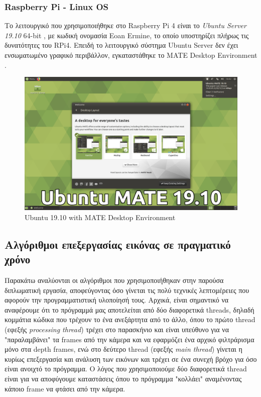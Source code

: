 \subsubsection{Raspberry Pi - Linux OS}
Το λειτουργικό που χρησιμοποιήθηκε στο Raspberry Pi 4 είναι το \emph{Ubuntu Server 19.10} 64-bit \cite{InstallU96:online}, με κωδική ονομασία Eoan Ermine, το οποίο υποστηρίζει πλήρως τις δυνατότητες του RPi4. Επειδή το λειτουργικό σύστημα Ubuntu Server δεν έχει ενσωματωμένο γραφικό περιβάλλον, εγκαταστάθηκε το MATE Desktop Environment \cite{MATEDesk37:online}.

\begin{figure}[H]
    \centering
    \includegraphics[width=\textwidth]{images/eoan-ermine-desktop.png}
    \caption{Ubuntu 19.10 with MATE Desktop Environment}
    \label{fig:mate}
\end{figure}

\subsection{Αλγόριθμοι επεξεργασίας εικόνας σε πραγματικό χρόνο}
Παρακάτω αναλύονται οι αλγόριθμοι που χρησιμοποιήθηκαν στην παρούσα διπλωματική εργασία, αποφεύγοντας όσο γίνεται τις πολύ τεχνικές λεπτομέρειες που αφορούν την προγραμματιστική υλοποίησή τους. Αρχικά, είναι σημαντικό να αναφέρουμε ότι το πρόγραμμά μας αποτελείται από δύο διαφορετικά threads, δηλαδή κομμάτια κώδικα που τρέχουν το ένα ανεξάρτητα από το άλλο, όπου το πρώτο thread (εφεξής \emph{processing thread}) τρέχει στο παρασκήνιο και είναι υπεύθυνο για να "παραλαμβάνει" τα frames από την κάμερα και να εφαρμόζει ένα αρχικό φιλτράρισμα μόνο στα depth frames, ενώ στο δεύτερο thread (εφεξής \emph{main thread}) γίνεται η κυρίως επεξεργασία και ανάλυση των εικόνων και τρέχει σε ένα συνεχή βρόχο για όσο είναι ανοιχτό το πρόγραμμα. Ο λόγος που χρησιμοποιούμε δύο διαφορετικά thread είναι για να αποφύγουμε καταστάσεις όπου το πρόγραμμα "κολλάει" αναμένοντας κάποιο frame να φτάσει από την κάμερα.

